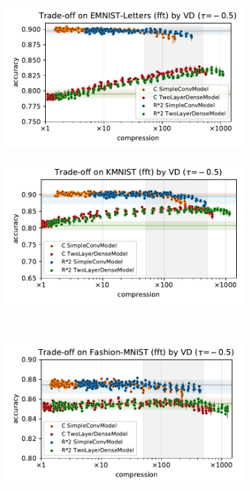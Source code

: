 \documentclass[a4paper,10pt,twocolumn]{article}
\begin{document}
\begin{figure}[b]
  \centering
  \begin{subfigure}[b]{0.5\columnwidth}
    \centering
    \includegraphics[width=\linewidth]{figure__mnist-like__trade-off/appendix__cmp__VD__emnist_letters__fft__-0.5.pdf}
  \end{subfigure}%
  \begin{subfigure}[b]{0.5\columnwidth}
    \centering
    \includegraphics[width=\linewidth]{figure__mnist-like__trade-off/appendix__cmp__VD__kmnist__fft__-0.5.pdf}
  \end{subfigure} \\ %
  \begin{subfigure}[b]{0.5\columnwidth}
    \centering
    \includegraphics[width=\linewidth]{figure__mnist-like__trade-off/appendix__cmp__VD__fashionmnist__fft__-0.5.pdf}

\end{subfigure}
\end{figure}
\end{document}
